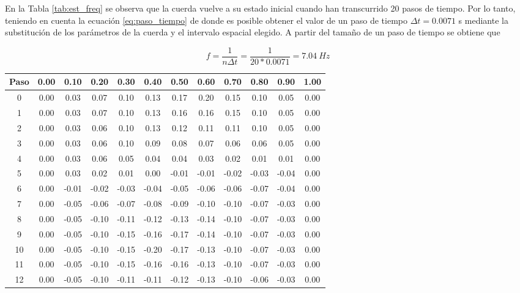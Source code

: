 \documentclass[11pt]{article}
\begin{document}
En la Tabla \ref{tab:est_freq} se observa que la cuerda vuelve a su estado inicial cuando
han transcurrido 20 pasos de tiempo. Por lo tanto, teniendo en cuenta la ecuación
\ref{eq:paso_tiempo} de donde es posible obtener el valor de un paso de tiempo
$\Delta{t} = 0.0071$ s mediante la substitución de los parámetros de la cuerda y el
intervalo espacial elegido. A partir del tamaño de un paso de tiempo se obtiene que

\begin{equation}
f = \frac{1}{n \Delta{t}} = \frac{1}{20 * 0.0071} = 7.04~Hz
\end{equation}

\begin{table}
\center
\begin{small}
\begin{tabular}{ c c c c c c c c c c c c }
\hline
Paso & 0.00 & 0.10 & 0.20 & 0.30 & 0.40 & 0.50 & 0.60 & 0.70 & 0.80 & 0.90 & 1.00 \\
\hline
\hline
0 & 0.00 & 0.03 & 0.07 & 0.10 & 0.13 & 0.17 & 0.20 & 0.15 & 0.10 & 0.05 & 0.00 \\
1 & 0.00 & 0.03 & 0.07 & 0.10 & 0.13 & 0.16 & 0.16 & 0.15 & 0.10 & 0.05 & 0.00 \\
2 & 0.00 & 0.03 & 0.06 & 0.10 & 0.13 & 0.12 & 0.11 & 0.11 & 0.10 & 0.05 & 0.00 \\
3 & 0.00 & 0.03 & 0.06 & 0.10 & 0.09 & 0.08 & 0.07 & 0.06 & 0.06 & 0.05 & 0.00 \\
4 & 0.00 & 0.03 & 0.06 & 0.05 & 0.04 & 0.04 & 0.03 & 0.02 & 0.01 & 0.01 & 0.00 \\
5 & 0.00 & 0.03 & 0.02 & 0.01 & 0.00 & -0.01 & -0.01 & -0.02 & -0.03 & -0.04 & 0.00 \\
6 & 0.00 & -0.01 & -0.02 & -0.03 & -0.04 & -0.05 & -0.06 & -0.06 & -0.07 & -0.04 & 0.00 \\
7 & 0.00 & -0.05 & -0.06 & -0.07 & -0.08 & -0.09 & -0.10 & -0.10 & -0.07 & -0.03 & 0.00 \\
8 & 0.00 & -0.05 & -0.10 & -0.11 & -0.12 & -0.13 & -0.14 & -0.10 & -0.07 & -0.03 & 0.00 \\
9 & 0.00 & -0.05 & -0.10 & -0.15 & -0.16 & -0.17 & -0.14 & -0.10 & -0.07 & -0.03 & 0.00 \\
10 & 0.00 & -0.05 & -0.10 & -0.15 & -0.20 & -0.17 & -0.13 & -0.10 & -0.07 & -0.03 & 0.00 \\
11 & 0.00 & -0.05 & -0.10 & -0.15 & -0.16 & -0.16 & -0.13 & -0.10 & -0.07 & -0.03 & 0.00 \\
12 & 0.00 & -0.05 & -0.10 & -0.11 & -0.11 & -0.12 & -0.13 & -0.10 & -0.06 & -0.03 & 0.00 \\

\end{tabular}
\end{small}
\end{table}
\end{document}
